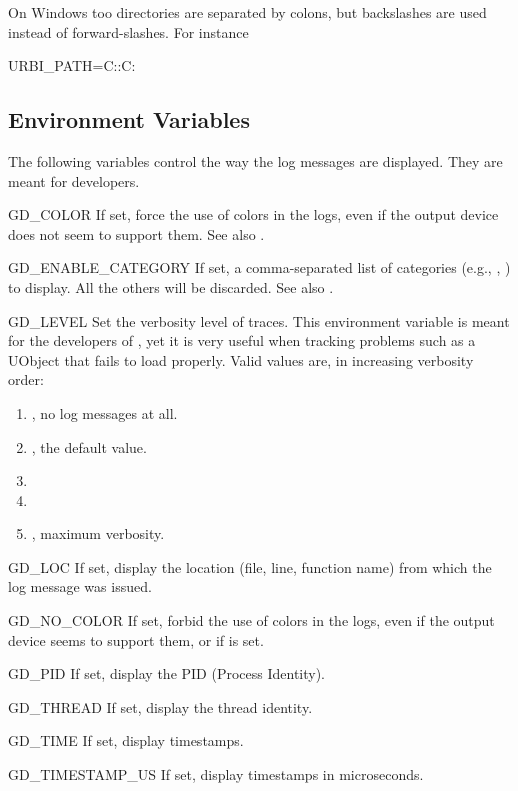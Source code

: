 \begin{windows}
  On Windows too directories are separated by colons, but backslashes
  are used instead of forward-slashes.  For instance
\begin{shell}
URBI_PATH=C:\cygwin\home\jessie\urbi:C:\cygwin\usr\local\urbi
\end{shell}
\end{windows}

\subsection{Environment Variables}
\label{sec:tools:env}

The following variables control the way the log messages are displayed.
They are meant for developers.
\begin{envs}
\item[GD\_COLOR] If set, force the use of colors in the logs, even if the
  output device does not seem to support them.  See also .
\item[GD\_ENABLE\_CATEGORY] If set, a comma-separated list of categories
  (e.g., , ) to display.  All the others will be
  discarded.  See also .
\item[GD\_LEVEL] Set the verbosity level of traces.  This environment
  variable is meant for the developers of \usdk, yet it is very useful
  when tracking problems such as a UObject that fails to load properly.
  Valid values are, in increasing verbosity order:
  \begin{enumerate}
  \item {}, no log messages at all.
  \item {}, the default value.
  \item {}
  \item {}
  \item {}, maximum verbosity.
  \end{enumerate}

\item[GD\_LOC] If set, display the location (file, line, function name) from
  which the log message was issued.

\item[GD\_NO\_COLOR] If set, forbid the use of colors in the logs, even if
  the output device seems to support them, or if  is set.

\item[GD\_PID] If set, display the PID (Process Identity).

\item[GD\_THREAD] If set, display the thread identity.

\item[GD\_TIME] If set, display timestamps.

\item[GD\_TIMESTAMP\_US] If set, display timestamps in microseconds.
\end{envs}

